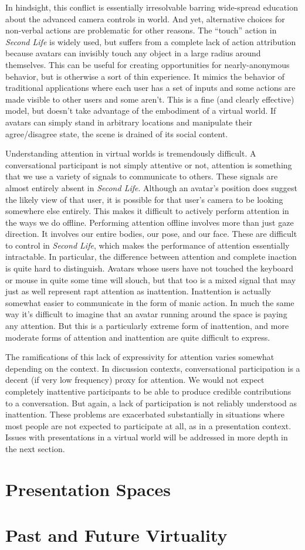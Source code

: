 In hindsight, this conflict is essentially irresolvable barring wide-spread education about the advanced camera controls in world. And yet, alternative choices for non-verbal actions are problematic for other reasons. The ``touch'' action in \emph{Second Life} is widely used, but suffers from a complete lack of action attribution because avatars can invisibly touch any object in a large radius around themselves. This can be useful for creating opportunities for nearly-anonymous behavior, but is otherwise a sort of thin experience. It mimics the behavior of traditional applications where each user has a set of inputs and some actions are made visible to other users and some aren't. This is a fine (and clearly effective) model, but doesn't take advantage of the embodiment of a virtual world. If avatars can simply stand in arbitrary locations and manipulate their agree/disagree state, the scene is drained of its social content.

Understanding attention in virtual worlds is tremendously difficult. A conversational participant is not simply attentive or not, attention is something that we use a variety of signals to communicate to others. These signals are almost entirely absent in \emph{Second Life}. Although an avatar's position does suggest the likely view of that user, it is possible for that user's camera to be looking somewhere else entirely. This makes it difficult to actively perform attention in the ways we do offline. Performing attention offline involves more than just gaze direction. It involves our entire bodies, our pose, and our face. These are difficult to control in \emph{Second Life}, which makes the performance of attention essentially intractable. In particular, the difference between attention and complete inaction is quite hard to distinguish. Avatars whose users have not touched the keyboard or mouse in quite some time will slouch, but that too is a mixed signal that may just as well represent rapt attention as inattention. Inattention is actually somewhat easier to communicate in the form of manic action. In much the same way it's difficult to imagine that an avatar running around the space is paying any attention. But this is a particularly extreme form of inattention, and more moderate forms of attention and inattention are quite difficult to express.

The ramifications of this lack of expressivity for attention varies somewhat depending on the context. In discussion contexts, conversational participation is a decent (if very low frequency) proxy for attention. We would not expect completely inattentive participants to be able to produce credible contributions to a conversation. But again, a lack of participation is not reliably understood as inattention. These problems are exacerbated substantially in situations where most people are not expected to participate at all, as in a presentation context. Issues with presentations in a virtual world will be addressed in more depth in the next section.


\section{Presentation Spaces}


\section{Past and Future Virtuality}